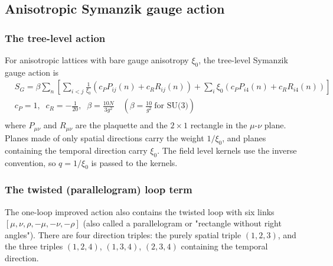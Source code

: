 \subsection{\label{sec:AnisotropicSymanzik}Anisotropic Symanzik gauge action}

\subsubsection{\label{sec:AnisoTreeLevel}The tree-level action}

For anisotropic lattices with bare gauge anisotropy $\xi_0$, the tree-level Symanzik gauge action is
\begin{equation}
\begin{split}
&S_G=\beta \sum _{n}\left[\sum _{i<j}\frac{1}{\xi _0}\left(c_P P_{ij}(n)+c_R R_{ij}(n)\right)+\sum _{i}\xi _0\left(c_P P_{i4}(n)+c_R R_{i4}(n)\right)\right]\\
&c_P=1,\;\;c_R=-\frac{1}{20},\;\;\beta =\frac{10N}{3g^2}\quad\left(\beta=\frac{10}{g^2}\ \text{for SU(3)}\right)\\
\end{split}
\end{equation}
where $P_{\mu\nu}$ and $R_{\mu\nu}$ are the plaquette and the $2\times 1$ rectangle in the $\mu$-$\nu$ plane. Planes made of only spatial directions carry the weight $1/\xi _0$, and planes containing the temporal direction carry $\xi _0$. The field level kernels use the inverse convention, so $q=1/\xi _0$ is passed to the kernels.

\subsubsection{\label{sec:AnisoTwistedLoop}The twisted (parallelogram) loop term}

The one-loop improved action also contains the twisted loop with six links $[\mu ,\nu ,\rho ,-\mu ,-\nu ,-\rho ]$ (also called a parallelogram or "rectangle without right angles"). There are four direction triples: the purely spatial triple $(1,2,3)$, and the three triples $(1,2,4)$, $(1,3,4)$, $(2,3,4)$ containing the temporal direction.

